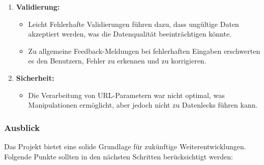     \begin{enumerate}
        \item \textbf{Validierung:}
        \begin{itemize}
            \item Leicht Fehlerhafte Validierungen führen dazu, dass ungültige Daten akzeptiert werden, was die Datenqualität beeinträchtigen könnte.
            \item Zu allgemeine Feedback-Meldungen bei fehlerhaften Eingaben erschwerten es den Benutzern, Fehler zu erkennen und zu korrigieren.
        \end{itemize}
        \item \textbf{Sicherheit:}
        \begin{itemize}
            \item Die Verarbeitung von URL-Parametern war nicht optimal, was Manipulationen ermöglicht, aber jedoch nicht zu Datenlecks führen kann.
        \end{itemize}
    \end{enumerate}

    \newpage

    \subsubsection{Ausblick}
    Das Projekt bietet eine solide Grundlage für zukünftige Weiterentwicklungen. Folgende Punkte sollten in den nächsten Schritten berücksichtigt werden:
    
